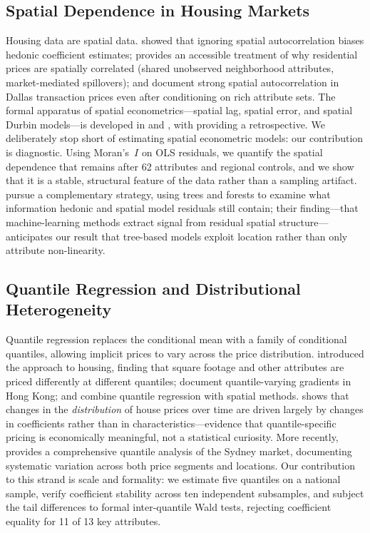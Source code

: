 \subsection{Spatial Dependence in Housing Markets}

Housing data are spatial data. \citet{can1992specification} showed that ignoring
spatial autocorrelation biases hedonic coefficient estimates;
\citet{dubin1998spatial} provides an accessible treatment of why residential
prices are spatially correlated (shared unobserved neighborhood attributes,
market-mediated spillovers); and \citet{basu1998analysis} document strong
spatial autocorrelation in Dallas transaction prices even after conditioning on
rich attribute sets. The formal apparatus of spatial econometrics---spatial lag,
spatial error, and spatial Durbin models---is developed in \citet{anselin1988spatial}
and \citet{lesage2009introduction}, with \citet{anselin2010thirty} providing a
retrospective. We deliberately stop short of estimating spatial econometric models:
our contribution is diagnostic. Using Moran's~$I$ \citep{moran1950notes} on OLS
residuals, we quantify the spatial dependence that remains after 62 attributes and
regional controls, and we show that it is a stable, structural feature of the data
rather than a sampling artifact. \citet{pace2020examining} pursue a complementary
strategy, using trees and forests to examine what information hedonic and spatial
model residuals still contain; their finding---that machine-learning methods
extract signal from residual spatial structure---anticipates our result that
tree-based models exploit location rather than only attribute non-linearity.

\subsection{Quantile Regression and Distributional Heterogeneity}

Quantile regression \citep{koenker1978regression, koenker2001quantile} replaces the
conditional mean with a family of conditional quantiles, allowing implicit prices
to vary across the price distribution. \citet{zietz2008determinants} introduced the
approach to housing, finding that square footage and other attributes are priced
differently at different quantiles; \citet{mak2010quantile} document quantile-varying
gradients in Hong Kong; and \citet{liao2012hedonic} combine quantile regression with
spatial methods. \citet{mcmillen2008changes} shows that changes in the
\emph{distribution} of house prices over time are driven largely by changes in
coefficients rather than in characteristics---evidence that quantile-specific
pricing is economically meaningful, not a statistical curiosity. More recently,
\citet{waltl2019variation} provides a comprehensive quantile analysis of the Sydney
market, documenting systematic variation across both price segments and locations.
Our contribution to this strand is scale and formality: we estimate five quantiles
on a national sample, verify coefficient stability across ten independent
subsamples, and subject the tail differences to formal inter-quantile Wald tests,
rejecting coefficient equality for 11 of 13 key attributes.

